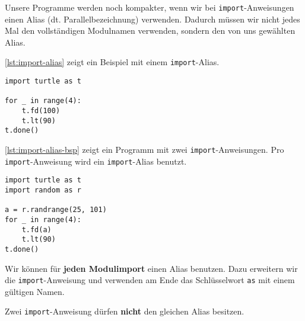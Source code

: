 Unsere Programme werden noch kompakter, wenn wir bei \lstinline[language={python3}]{import}-Anweisungen einen Alias (dt. Parallelbezeichnung) verwenden. Dadurch müssen wir nicht jedes Mal den vollständigen Modulnamen verwenden, sondern den von uns gewählten Alias.

\begin{example}
\autoref{lst:import-alias} zeigt ein Beispiel mit einem \lstinline[language={python3}]{import}-Alias.

\begin{lstlisting}[language={python3}, caption={\protect\lstset{language=python3} Das Turtle-Modul erhält in Zeile $1$ die Bezeichnung \lstinline{t}. Danach können wir die Funktionsaufrufe aus diesem Modul nur noch mit dieser Bezeichnung verwenden.}, label={lst:import-alias}]
import turtle as t

for _ in range(4):
	t.fd(100)
	t.lt(90)
t.done()
\end{lstlisting}
\end{example}

\begin{example}
\autoref{lst:import-alias-bsp} zeigt ein Programm mit zwei \lstinline[language={python3}]{import}-Anweisungen. Pro \lstinline[language={python3}]{import}-Anweisung wird ein \lstinline[language={python3}]{import}-Alias benutzt.

\begin{lstlisting}[language={python3}, caption={\protect\lstset{language=python3} Zwei \lstinline{import}-Anweisungen mit \lstinline{import}-Aliasing.}, label={lst:import-alias-bsp}]
import turtle as t
import random as r

a = r.randrange(25, 101)
for _ in range(4):
	t.fd(a)
	t.lt(90)
t.done()
\end{lstlisting}

\end{example}

Wir können für \textbf{jeden Modulimport} einen Alias benutzen. Dazu erweitern wir die \lstinline[language={python3}]{import}-Anweisung und verwenden am Ende das Schlüsselwort \lstinline[language={python3}]{as} mit einem gültigen Namen.

\begin{important}
Zwei \lstinline[language={python3}]{import}-Anweisung dürfen \textbf{nicht} den gleichen Alias besitzen.
\end{important}